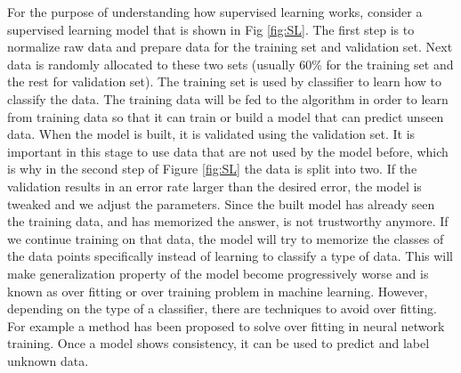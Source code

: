 For the purpose of understanding how supervised learning works, consider a supervised learning model that is shown in Fig \ref{fig:SL}. The first step is to normalize raw data and prepare data for the training set and validation set. Next data is randomly allocated to these two sets (usually $60$\% for the training set and the rest for validation set). The training set is used by classifier to learn how to classify the data. The training data will be fed to the algorithm in order to learn from training data so that it can train or build a model that can predict unseen data. When the model is built, it is validated using the validation set. It is important in this stage to use data that are not used by the model before, which is why in the second step of Figure \ref{fig:SL} the data is split into two. If the validation results in an error rate larger than the desired error, the model is tweaked and we adjust the parameters. Since the built model has already seen the training data, and has memorized the answer, is not trustworthy anymore. If we continue training on that data, the model will try to memorize the classes of the data points specifically instead of learning to classify a type of data. This will make generalization property of the model become progressively worse and is known as over fitting or over training \cite{hawkins2004problem} problem in machine learning. However, depending on the type of a classifier, there are techniques to avoid over fitting. For example a method \cite{Piotrowski201397} has been proposed to solve over fitting in neural network training. Once a model shows consistency, it can be used to predict and label unknown data. \\  
 









